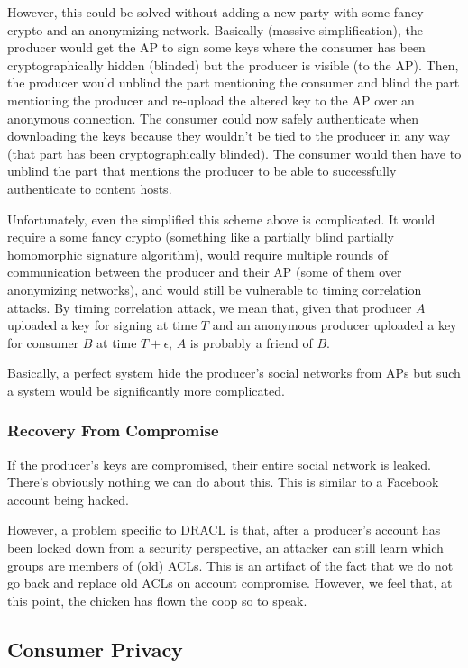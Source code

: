 \documentclass[pdftex,12pt,a4papaer,twoside,notitlepage]{report}
\begin{document}
However, this could be solved without adding a new party with some fancy crypto
and an anonymizing network. Basically (massive simplification), the producer
would get the AP to sign some keys where the consumer has been cryptographically
hidden (blinded) but the producer is visible (to the AP). Then, the producer
would unblind the part mentioning the consumer and blind the part mentioning the
producer and re-upload the altered key to the AP over an anonymous connection.
The consumer could now safely authenticate when downloading the keys because
they wouldn't be tied to the producer in any way (that part has been
cryptographically blinded). The consumer would then have to unblind the part
that mentions the producer to be able to successfully authenticate to content
hosts.

Unfortunately, even the simplified this scheme above is complicated. It would
require a some fancy crypto (something like a partially blind partially
homomorphic signature algorithm), would require multiple rounds of communication
between the producer and their AP (some of them over anonymizing networks), and
would still be vulnerable to timing correlation attacks. By timing correlation
attack, we mean that, given that producer $A$ uploaded a key for signing at time
$T$ and an anonymous producer uploaded a key for consumer $B$ at time
$T+\epsilon$, $A$ is probably a friend of $B$.

Basically, a perfect system hide the producer's social networks from APs but
such a system would be significantly more complicated.

\subsubsection{Recovery From Compromise}

If the producer's keys are compromised, their entire social network is leaked.
There's obviously nothing we can do about this. This is similar to a Facebook
account being hacked.

However, a problem specific to DRACL is that, after a producer's account has
been locked down from a security perspective, an attacker can still learn which
groups are members of (old) ACLs. This is an artifact of the fact that we do not
go back and replace old ACLs on account compromise. However, we feel that, at
this point, the chicken has flown the coop so to speak.

\subsection{Consumer Privacy}
\label{sub:consumer_privacy}
\end{document}
